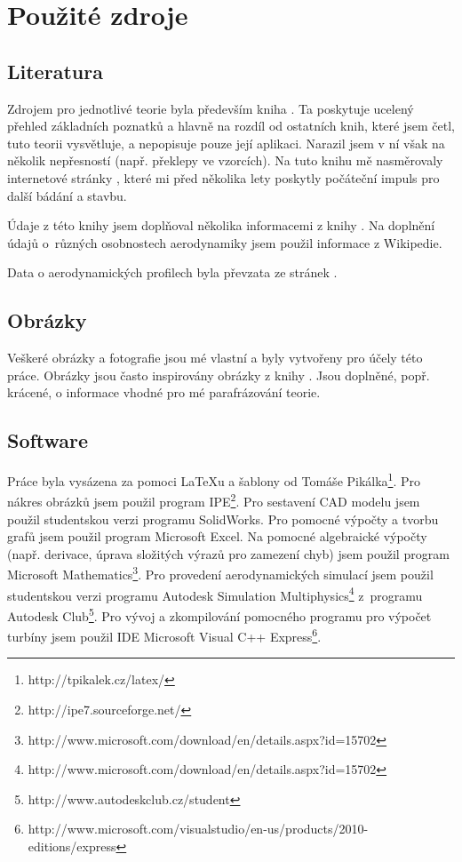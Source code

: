 	\section{Použité zdroje}
		\subsection{Literatura}
			Zdrojem pro jednotlivé teorie byla především kniha \cite{Rychetnik:Motory}. Ta poskytuje ucelený přehled základních poznatků a hlavně na rozdíl od ostatních knih, které jsem četl, tuto teorii vysvětluje, a nepopisuje pouze její aplikaci. Narazil jsem v ní však na několik nepřesností (např. překlepy ve vzorcích). Na tuto knihu mě nasměrovaly internetové stránky \cite{ve:ve}, které mi před několika lety poskytly počáteční impuls pro další bádání a stavbu.
			
			Údaje z této knihy jsem doplňoval několika informacemi z knihy \cite{Crome:Technika}. Na doplnění údajů o~různých osobnostech aerodynamiky jsem použil informace z Wikipedie.
			
			Data o aerodynamických profilech byla převzata ze stránek \cite{profil}.
			
		\subsection{Obrázky}
			Veškeré obrázky a fotografie jsou mé vlastní a byly vytvořeny pro účely této práce. Obrázky jsou často inspirovány obrázky z knihy \cite{Rychetnik:Motory}. Jsou doplněné, popř. krácené, o informace vhodné pro mé parafrázování teorie.
		\subsection{Software}
			Práce byla vysázena za pomoci \LaTeX u a šablony od Tomáše Pikálka\footnote{http://tpikalek.cz/latex/}. Pro nákres obrázků jsem použil program IPE\footnote{http://ipe7.sourceforge.net/}. Pro sestavení CAD modelu jsem použil studentskou verzi programu SolidWorks. Pro pomocné výpočty a tvorbu grafů jsem použil program Microsoft Excel. Na pomocné algebraické výpočty (např. derivace, úprava složitých výrazů pro zamezení chyb) jsem použil program Microsoft Mathematics\footnote{http://www.microsoft.com/download/en/details.aspx?id=15702}. Pro provedení aerodynamických simulací jsem použil studentskou verzi programu Autodesk Simulation Multiphysics\footnote{http://www.microsoft.com/download/en/details.aspx?id=15702}  z~programu Autodesk Club\footnote{http://www.autodeskclub.cz/student}. Pro vývoj a zkompilování pomocného programu pro výpočet turbíny jsem použil IDE Microsoft Visual C++ Express\footnote{http://www.microsoft.com/visualstudio/en-us/products/2010-editions/express}.
